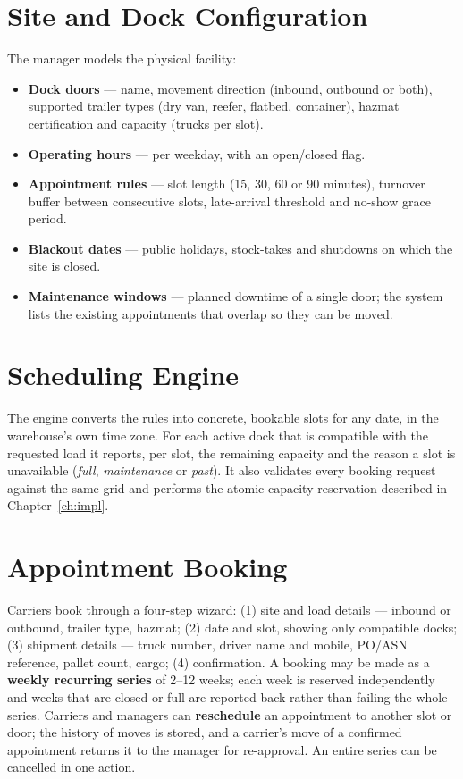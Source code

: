 \section{Site and Dock Configuration}
The manager models the physical facility:
\begin{itemize}
  \item \textbf{Dock doors} --- name, movement direction (inbound, outbound or both), supported trailer types (dry van, reefer, flatbed, container), hazmat certification and capacity (trucks per slot).
  \item \textbf{Operating hours} --- per weekday, with an open/closed flag.
  \item \textbf{Appointment rules} --- slot length (15, 30, 60 or 90 minutes), turnover buffer between consecutive slots, late-arrival threshold and no-show grace period.
  \item \textbf{Blackout dates} --- public holidays, stock-takes and shutdowns on which the site is closed.
  \item \textbf{Maintenance windows} --- planned downtime of a single door; the system lists the existing appointments that overlap so they can be moved.
\end{itemize}

\section{Scheduling Engine}
The engine converts the rules into concrete, bookable slots for any date, in the warehouse's own time zone. For each active dock that is compatible with the requested load it reports, per slot, the remaining capacity and the reason a slot is unavailable (\emph{full}, \emph{maintenance} or \emph{past}). It also validates every booking request against the same grid and performs the atomic capacity reservation described in Chapter~\ref{ch:impl}.

\section{Appointment Booking}
Carriers book through a four-step wizard: (1) site and load details --- inbound or outbound, trailer type, hazmat; (2) date and slot, showing only compatible docks; (3) shipment details --- truck number, driver name and mobile, PO/ASN reference, pallet count, cargo; (4) confirmation. A booking may be made as a \textbf{weekly recurring series} of 2--12 weeks; each week is reserved independently and weeks that are closed or full are reported back rather than failing the whole series. Carriers and managers can \textbf{reschedule} an appointment to another slot or door; the history of moves is stored, and a carrier's move of a confirmed appointment returns it to the manager for re-approval. An entire series can be cancelled in one action.

